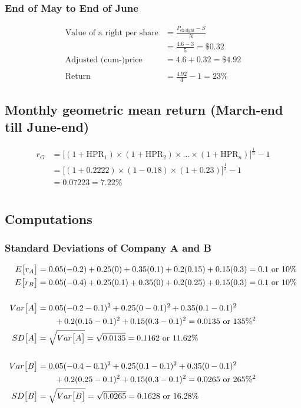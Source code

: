 \documentclass[12pt]{article}
\begin{document}
\subsubsection{End of May to End of June}
\begin{align*}
	\text{Value of a right per share} &= \frac{P_{\text{ex-right}}-S}{N}\\
	&= \frac{4.6-3}{5} = \$0.32\\
	\text{Adjusted (cum-)price} &= 4.6 + 0.32 = \$4.92\\
	&\\
	\text{Return} &= \frac{4.92}{4}-1 = 23\%
\end{align*}

\subsection{Monthly geometric mean return (March-end till June-end)}
\begin{align*}
	r_G &= \big[(1+\text{HPR}_1)\times(1+\text{HPR}_2)\times...\times(1+\text{HPR}_n)\big]^{\frac{1}{n}} - 1\\
	&= \big[(1+0.2222)\times(1-0.18)\times(1+0.23)\big]^{\frac{1}{3}}-1\\
	&= 0.07223 = 7.22\%
\end{align*}

\section{}
\subsection{Computations}
\subsubsection{Standard Deviations of Company A and B}
\begin{align*}
	E\big[r_A\big] &= 0.05(-0.2) + 0.25(0) + 0.35(0.1) + 0.2(0.15) + 0.15(0.3) = 0.1 \text{ or } 10\%\\
	E\big[r_B\big] &= 0.05(-0.4) + 0.25(0.1) + 0.35(0) + 0.2(0.25) + 0.15(0.3) = 0.1 \text{ or } 10\%\\
	&\\
	Var\big[A\big] &= 0.05(-0.2-0.1)^2 + 0.25(0-0.1)^2 + 0.35(0.1-0.1)^2\\
	&\text{\qquad} + 0.2(0.15-0.1)^2 + 0.15(0.3-0.1)^2 = 0.0135 \text{ or } 135\%^2\\
	SD\big[A\big] &= \sqrt{Var\big[A\big]} = \sqrt{0.0135} = 0.1162 \text{ or } 11.62\%\\
	&\\
	Var\big[B\big] &= 0.05(-0.4-0.1)^2 + 0.25(0.1-0.1)^2 + 0.35(0-0.1)^2\\ 
	&\text{\qquad} + 0.2(0.25-0.1)^2 + 0.15(0.3-0.1)^2 = 0.0265 \text{ or } 265\%^2\\
	SD\big[B\big] &= \sqrt{Var\big[B\big]} = \sqrt{0.0265} = 0.1628 \text{ or } 16.28\%\\
\end{align*}
\end{document}
